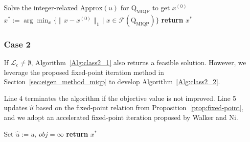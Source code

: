 \documentclass[]{article}
\begin{document}
\begin{algorithm}[!htbp]
\SetAlgoLined
\LinesNumbered
{}
  Solve the integer-relaxed $\mbox{Approx}(u)$ for $\mathrm{Q}_{\mathrm{MIQP}}$ to get $x^{(0)}$\;
 $x^* := \arg\min_x\{\|x - x^{(0)}\|_1\ |\ x\in \mathcal{F}(\mathrm{Q}_{\mathrm{MIQP}})\}$\;
 \textbf{return} $x^*$
 \caption{Random Flip and Project}
 \label{Alg:class2_1}
\end{algorithm}

\subsubsection{Case 2}

If $\mathcal{L}_c\neq \emptyset$, Algorithm~\ref{Alg:class2_1} also returns a feasible solution. However, we leverage the proposed fixed-point iteration method in Section~\ref{sec:eigen_method_miqp} to develop Algorithm~\ref{Alg:class2_2}. 

Line 4 terminates the algorithm if the objective value is not improved. Line 5 updates $\hat{u}$ based on the fixed-point relation from Proposition~\ref{prop:fixed-point}, and we adopt an accelerated fixed-point iteration proposed by Walker and Ni\cite{walker2011anderson}.

\begin{algorithm}[!htbp]
\SetAlgoLined
\LinesNumbered
{}
 Set $\hat{u}:=u$, $obj = \infty$\;
 \textbf{return} $x^*$
 \caption{Projection and Fixed-Point Iterations}
 \label{Alg:class2_2}
\end{algorithm}
\end{document}
